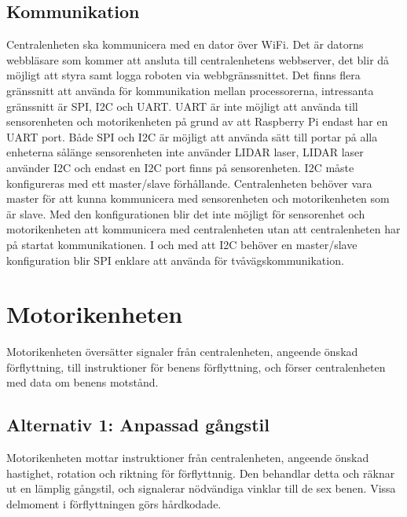 \documentclass[a4paper,titlepage,12pt]{article}
\begin{document}
	\subsection{Kommunikation}
	Centralenheten ska kommunicera med en dator över WiFi. Det är datorns webbläsare 
	som kommer att ansluta till centralenhetens webbserver, det blir då möjligt att 
	styra samt logga roboten via webbgränssnittet. Det finns flera gränssnitt att 
	använda för kommunikation mellan processorerna, intressanta gränssnitt är SPI, 
	I2C och UART. UART är inte möjligt att använda till sensorenheten och 
	motorikenheten på grund av att Raspberry Pi endast har en UART port. Både 
	SPI och I2C är möjligt att använda sätt till portar på alla enheterna sålänge 
	sensorenheten inte använder LIDAR laser, LIDAR laser använder I2C och endast en 
	I2C port finns på sensorenheten. I2C måste konfigureras med ett master/slave 
	förhållande. Centralenheten behöver vara master för att kunna kommunicera med 
	sensorenheten och motorikenheten som är slave. Med den konfigurationen blir 
	det inte möjligt för sensorenhet och motorikenheten att kommunicera med
	centralenheten utan att centralenheten har på startat kommunikationen. I och 
	med att I2C behöver en master/slave konfiguration blir SPI enklare att använda 
	för tvåvägskommunikation. 



	
	\section{Motorikenheten}
    	Motorikenheten översätter signaler från centralenheten, angeende önskad förflyttning, 
    	till instruktioner för benens förflyttning, och förser centralenheten med data om
    	benens motstånd.
    
    	\subsection{Alternativ 1: Anpassad gångstil}
    	Motorikenheten mottar instruktioner från centralenheten, angeende önskad hastighet, 
    	rotation och riktning för förflyttnnig. Den behandlar detta och räknar ut en lämplig 
	gångstil, och signalerar nödvändiga vinklar till de sex benen. Vissa delmoment i 
	förflyttningen görs hårdkodade. 
    
\end{document}
